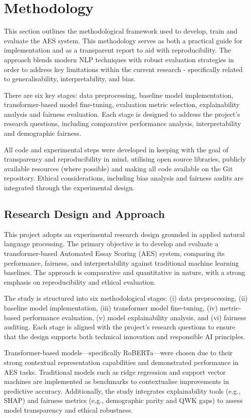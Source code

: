 \documentclass[10pt]{report}
\begin{document}
\chapter{Methodology}
This section outlines the methodological framework used to develop, train and evaluate the AES system. This methodology serves as both a practical guide for implementation and as a transparent report to aid with reproducibility. The approach blends modern NLP techniques with robust evaluation strategies in order to address key limitations within the current research - specifically related to generalisability, interpretability, and bias.

There are six key stages: data preprocessing,  baseline model implementation, transformer-based model fine-tuning, evaluation metric selection, explainability analysis and fairness evaluation. Each stage is designed to address the project's research questions, including comparative performance analysis, interpretability and demographic fairness.

All code and experimental steps were developed in keeping with the goal of transparency and reproducibility in mind, utilising open source libraries, publicly available resources (where possible) and making all code available on the Git repository. Ethical considerations, including bias analysis and fairness audits are integrated through the experimental design.

\section{Research Design and Approach}
This project adopts an experimental research design grounded in applied natural language processing. The primary objective is to develop and evaluate a transformer-based Automated Essay Scoring (AES) system, comparing its performance, fairness, and interpretability against traditional machine learning baselines. The approach is comparative and quantitative in nature, with a strong emphasis on reproducibility and ethical evaluation.

The study is structured into six methodological stages: (i) data preprocessing, (ii) baseline model implementation, (iii) transformer model fine-tuning, (iv) metric-based performance evaluation, (v) model explainability analysis, and (vi) fairness auditing. Each stage is aligned with the project’s research questions to ensure that the design supports both technical innovation and responsible AI principles.

Transformer-based models—specifically RoBERTa—were chosen due to their strong contextual representation capabilities and demonstrated performance in AES tasks. Traditional models such as ridge regression and support vector machines are implemented as benchmarks to contextualise improvements in predictive accuracy. Additionally, the study integrates explainability tools (e.g., SHAP) and fairness metrics (e.g., demographic parity and QWK gaps) to assess model transparency and ethical robustness.
\end{document}
